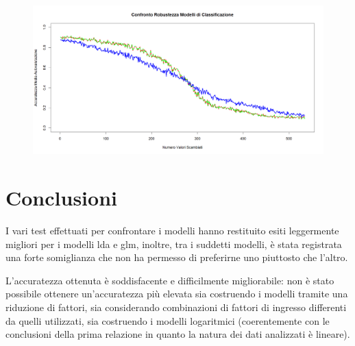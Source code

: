 \documentclass[11pt,a4paper]{article}
\begin{document}
\begin{figure}[h]
    \hspace{-.8cm}
	\includegraphics[scale=0.5]{imgs/robustness.png}
    \end{figure}
\vspace{-0.4cm}

\section{Conclusioni}
I vari test effettuati per confrontare i modelli hanno restituito esiti leggermente migliori per i modelli lda e glm, inoltre, tra i suddetti modelli, è stata registrata una forte somiglianza che non ha permesso di preferirne uno piuttosto che l'altro.

L'accuratezza ottenuta è soddisfacente e difficilmente migliorabile: non è stato possibile ottenere un'accuratezza più elevata sia costruendo i modelli tramite una riduzione di fattori, sia considerando combinazioni di fattori di ingresso differenti da quelli utilizzati, sia costruendo i modelli logaritmici (coerentemente con le conclusioni della prima relazione in quanto la natura dei dati analizzati è lineare).
\end{document}
